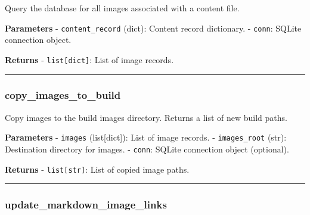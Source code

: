 \begin{Shaded}
\begin{Highlighting}[]
\end{Highlighting}
\end{Shaded}

Query the database for all images associated with a content file.

\textbf{Parameters} - \texttt{content\_record} (dict): Content record
dictionary. - \texttt{conn}: SQLite connection object.

\textbf{Returns} - \texttt{list{[}dict{]}}: List of image records.

\begin{center}\rule{0.5\linewidth}{0.5pt}\end{center}

\subsubsection{copy\_images\_to\_build}\label{copy_images_to_build}

\begin{Shaded}
\begin{Highlighting}[]
\OperatorTok{=}\OperatorTok{=}\NormalTok{)}
\end{Highlighting}
\end{Shaded}

Copy images to the build images directory. Returns a list of new build
paths.

\textbf{Parameters} - \texttt{images} (list{[}dict{]}): List of image
records. - \texttt{images\_root} (str): Destination directory for
images. - \texttt{conn}: SQLite connection object (optional).

\textbf{Returns} - \texttt{list{[}str{]}}: List of copied image paths.

\begin{center}\rule{0.5\linewidth}{0.5pt}\end{center}

\subsubsection{update\_markdown\_image\_links}\label{update_markdown_image_links}

\begin{Shaded}
\begin{Highlighting}[]
\OperatorTok{=}
\end{Highlighting}
\end{Shaded}

